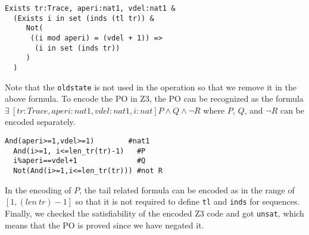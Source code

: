 \begin{mdframed}[roundcorner=5pt]
\begin{Verbatim}[fontsize=\small]
Exists tr:Trace, aperi:nat1, vdel:nat1 &
  (Exists i in set (inds (tl tr)) &
     Not(
      ((i mod aperi) = (vdel + 1)) =>
       (i in set (inds tr))
     )
  )
\end{Verbatim}
\end{mdframed}

Note that the {\tt oldstate} is not used in the operation so that we remove it in the above formula. To encode the PO in Z3, the PO can be recognized as the formula $\exists~[tr:Trace,aperi:nat1,vdel:nat1,i:nat] P \land Q \land \neg R$ where $P$, $Q$, and $\neg R$ can be encoded separately.

\begin{mdframed}[roundcorner=5pt,shadow=true]
\begin{Verbatim}[fontsize=\small]
  And(aperi>=1,vdel>=1)        #nat1
  And(i>=1, i<=len_tr(tr)-1)   #P
  i%aperi==vdel+1              #Q
  Not(And(i>=1,i<=len_tr(tr))) #not R
\end{Verbatim}
\end{mdframed}

In the encoding of $P$, the tail related formula can be encoded as in the range of $[1,(len~tr)-1]$ so that it is not required to define {\tt tl} and {\tt inds} for sequences. Finally, we checked the satisfiability of the encoded Z3 code and got {\tt unsat}, which means that the PO is proved since we have negated it.





